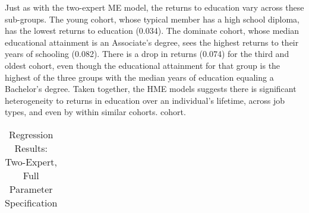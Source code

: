 \documentclass[12pt]{article}
\theoremstyle{definition}
\begin{document}
Just as with the two-expert ME model, the returns to education vary across these 
sub-groups. The young cohort, whose typical member has a high school diploma, has
the lowest returns to education (0.034). The dominate cohort, whose median educational attainment 
is an Associate's degree, sees the highest returns to their years of schooling (0.082).
There is a drop in returns (0.074) for the third and oldest cohort, even though the educational
attainment for that group is the highest of the three groups with the median years of
education equaling a Bachelor's degree. Taken together, the HME models
suggests there is significant heterogeneity to returns in education over an
individual's lifetime, across job types, and even by within similar cohorts.
cohort.


\begin{landscape}
  \begin{table} \centering
    \caption{Regression Results: Two-Expert, Full Parameter Specification}
      \begin{threeparttable}
        \tabcolsep=0.11cm
        \begin{tabular}[l]{l r l l r l l c r l c r l l r l l r l l}
  

\end{tabular}
\end{threeparttable}
\end{table}
\end{landscape}
\end{document}
